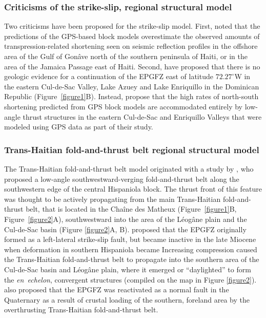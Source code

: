 \documentclass[linenumbers,draft]{agujournal}
\begin{document}
\subsubsection{Criticisms of the strike-slip, regional structural model}
Two criticisms have been proposed for the strike-slip model. First, \citet{corbeau2016transpressive} noted that the predictions of the GPS-based block models overestimate the observed amounts of transpression-related shortening seen on seismic reflection profiles in the offshore area of the Gulf of Gon\^ave north of the southern peninsula of Haiti, or in the area of the Jamaica Passage east of Haiti. Second, \citet{symithe2016present} have proposed that there is no geologic evidence for a continuation of the EPGFZ east of latitude $72.27^{\circ}$W in the eastern Cul-de-Sac Valley, Lake Azuey and Lake Enriquillo in the Dominican Republic (Figure~\ref{figure1}B). Instead, \citet{symithe2016present} propose that the high rates of north-south shortening predicted from GPS block models are accommodated entirely by low-angle thrust structures in the eastern Cul-de-Sac and Enriquillo Valleys that were modeled using GPS data as part of their study.

\subsubsection{Trans-Haitian fold-and-thrust belt regional structural model}
The Trans-Haitian fold-and-thrust belt model originated with a study by \citet{pubellier2000plate}, who proposed a low-angle southwestward-verging fold-and-thrust belt along the southwestern edge of the central Hispaniola block. The thrust front of this feature was thought to be actively propagating from the main Trans-Haitian fold-and-thrust belt, that is located in the Cha\^ine des Matheux (Figure~\ref{figure1}B, Figure~\ref{figure2}A), southwestward into the area of the L\'eog\^ane plain and the Cul-de-Sac basin (Figure \ref{figure2}A, B). \citet{pubellier2000plate} proposed that the EPGFZ originally formed as a left-lateral strike-slip fault, but became inactive in the late Miocene when deformation in southern Hispaniola became Increasing compression caused the Trans-Haitian fold-and-thrust belt to propagate into the southern area of the Cul-de-Sac basin and L\'eog\^ane plain, where it emerged or ``daylighted'' to form the \textit{en~echelon}, convergent structures (compiled on the map in Figure \ref{figure2}). \citet{pubellier2000plate} also proposed that the EPGFZ was reactivated as a normal fault in the Quaternary as a result of crustal loading of the southern, foreland area by the overthrusting Trans-Haitian fold-and-thrust belt. 
\end{document}
